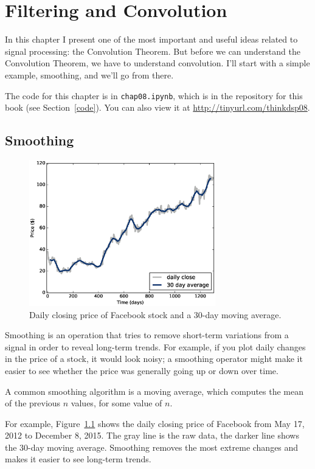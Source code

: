 \documentclass[12pt]{book}
\begin{document}
\chapter{Filtering and Convolution}

In this chapter I present one of the most important and useful
ideas related to signal processing: the Convolution Theorem.
But before we can understand the Convolution Theorem, we have to understand
convolution.  I'll start with a simple example, smoothing, and
we'll go from there.

The code for this chapter is in {\tt chap08.ipynb}, which is in the
repository for this book (see Section~\ref{code}).
You can also view it at \url{http://tinyurl.com/thinkdsp08}.


\section{Smoothing}
\label{smoothing}

\begin{figure}
\centerline{\includegraphics[height=2.5in]{figs/convolution1.eps}}
\caption{Daily closing price of Facebook stock and a 30-day moving
average.}
\label{fig.convolution1}
\end{figure}

Smoothing is an operation that tries to remove short-term variations
from a signal in order to reveal long-term trends.  For example, if
you plot daily changes in the price of a stock, it would look noisy;
a smoothing operator might make it easier to see whether the price
was generally going up or down over time.  

A common smoothing algorithm is a moving average, which computes
the mean of the previous $n$ values, for some value of $n$.

For example, Figure~\ref{fig.convolution1} shows the daily
closing price of Facebook from May 17, 2012 to December 8,
2015.  The gray line
is the raw data, the darker line shows the 30-day moving average.
Smoothing removes the most
extreme changes and makes it easier to see long-term trends.
\end{document}

